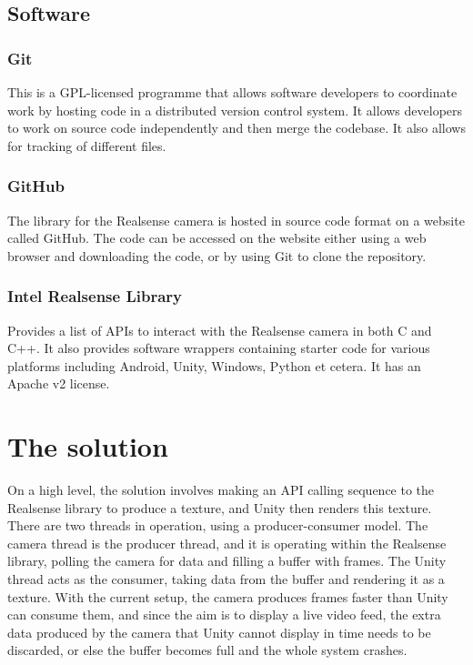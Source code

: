     \subsection{Software}
        \subsubsection{Git}
        This is a GPL-licensed programme that allows software developers to coordinate work by hosting code in a distributed version control system. It allows developers to work on source code independently and then merge the codebase. It also allows for tracking of different files.
        \subsubsection{GitHub}
        The library for the Realsense camera is hosted in source code format on a website called GitHub. The code can be accessed on the website either using a web browser and downloading the code, or by using Git to clone the repository.
        \subsubsection{Intel Realsense Library}
        Provides a list of APIs to interact with the Realsense camera in both C and C++. It also provides software wrappers containing starter code for various platforms including Android, Unity, Windows, Python et cetera. It has an Apache v2 license.

\section{The solution}
    On a high level, the solution involves making an API calling sequence to the Realsense library to produce a texture, and Unity then renders this texture. There are two threads in operation, using a producer-consumer model. The camera thread is the producer thread, and it is operating within the Realsense library, polling the camera for data and filling a buffer with frames. The Unity thread acts as the consumer, taking data from the buffer and rendering it as a texture. With the current setup, the camera produces frames faster than Unity can consume them, and since the aim is to display a live video feed, the extra data produced by the camera that Unity cannot display in time needs to be discarded, or else the buffer becomes full and the whole system crashes.


